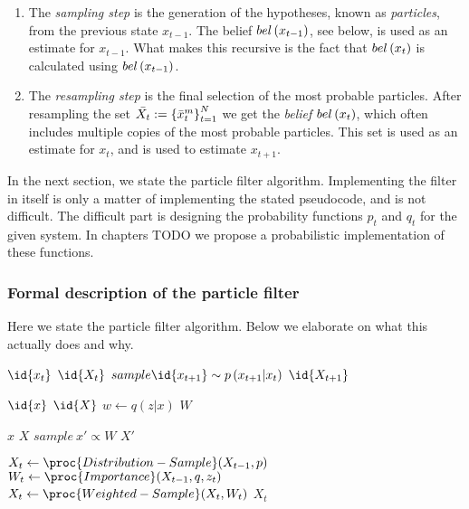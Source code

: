 \begin{enumerate}
\item The \emph{sampling step} is the generation of the hypotheses, known as \emph{particles}, from the previous state $x_{t-1}$. The belief $bel\left(x_{t-1}\right)$, see below, is used as an estimate for $x_{t-1}$. What makes this recursive is the fact that $bel\left(x_t\right)$ is calculated using $bel\left(x_{t-1}\right)$.

\item The \emph{resampling step} is the final selection of the most probable particles. After resampling the set $\bar{X_t} := \left\{\bar{x}_{t}^{m}\right\}_{t=1}^{N}$ we get the \emph{belief} $bel\left(x_t\right)$, which often includes multiple copies of the most probable particles. This set is used as an estimate for $x_t$, and is used to estimate $x_{t+1}$.
\end{enumerate}

In the next section, we state the particle filter algorithm. Implementing the filter in itself is only a matter of implementing the stated pseudocode, and is not difficult. The difficult part is designing the probability functions $p_t$ and $q_t$ for the given system. In chapters TODO we propose a probabilistic implementation of these functions.


\subsubsection{Formal description of the particle filter}
Here we state the particle filter algorithm. Below we elaborate on what this actually does and why.

\begin{codebox}
\li \ForEach $\id{x_t}$ \In $\id{X_t}$
\li     \Do
            $sample \id{x_{t+1}} \sim p\left(x_{t+1}|x_t\right)$
        \End
\li \Return $\id{X_{t+1}}$
\end{codebox}
\begin{codebox}
\li \ForEach $\id{x}$ \In $\id{X}$ 
\li     \Do
            $w \gets q\left(z|x\right)$
        \End
\li \Return $W$
\end{codebox}
\begin{codebox}
\li \ForEach $x$ \In $X$
\li     \Do
            $sample ~ x' \propto W$   
        \End
\li \Return $X'$
\end{codebox}
\begin{codebox}
\li $X_t \gets \proc{Distribution-Sample}(X_{t-1},p)$
\li $W_t \gets \proc{Importance}(X_{t-1},q,z_t)$
\li $X_t \gets \proc{Weighted-Sample}(X_t,W_t)$
\li \Return $X_t$
\end{codebox}

